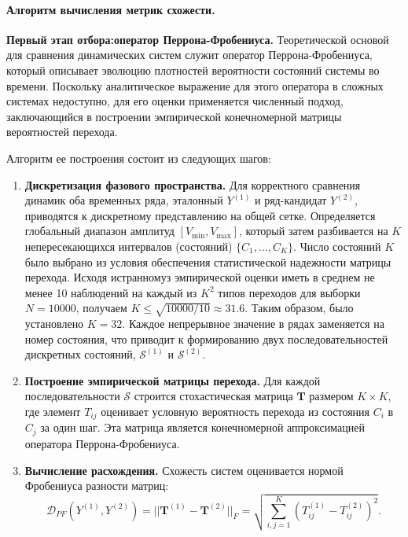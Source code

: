 \paragraph{Алгоритм вычисления метрик схожести.}

\textbf{Первый этап отбора:оператор Перрона-Фробениуса.}
Теоретической основой для сравнения динамических систем служит оператор Перрона-Фробениуса,
 который описывает эволюцию плотностей вероятности состояний системы во времени. 
 Поскольку аналитическое выражение для этого оператора в сложных системах недоступно, 
 для его оценки применяется численный подход, заключающийся в построении эмпирической 
 конечномерной матрицы вероятностей перехода.

Алгоритм ее построения состоит из следующих шагов:

\begin{enumerate}
    \item \textbf{Дискретизация фазового пространства.} Для корректного сравнения 
    динамик оба временных ряда, эталонный $Y^{(1)}$ и ряд-кандидат $Y^{(2)}$, приводятся
     к дискретному представлению на общей сетке. Определяется глобальный диапазон амплитуд 
     $[V_{\min}, V_{\max}]$, который затем разбивается на $K$ непересекающихся интервалов 
     (состояний) $\{C_1, \dots, C_K\}$.
     Число состояний $K$ было выбрано из условия обеспечения статистической надежности
       матрицы перехода. Исходя истранномуз эмпирической оценки иметь в среднем не менее 10 наблюдений
        на каждый из $K^2$ типов переходов для выборки $N=10000$, получаем
         $K \le \sqrt{10000/10} \approx 31.6$. Таким образом, было установлено $K=32$.
 Каждое
      непрерывное значение в рядах заменяется на номер состояния, что приводит к 
      формированию двух последовательностей дискретных состояний, 
      $\mathcal{S}^{(1)}$ и $\mathcal{S}^{(2)}$.

    \item \textbf{Построение эмпирической матрицы перехода.} Для каждой 
    последовательности $\mathcal{S}$ строится стохастическая матрица $\mathbf{T}$ 
    размером $K \times K$, где элемент $T_{ij}$ оценивает условную вероятность перехода
    из состояния $C_i$ в $C_j$ за один шаг. Эта матрица является конечномерной аппроксимацией
     оператора Перрона-Фробениуса.

    \item \textbf{Вычисление расхождения.} Схожесть систем оценивается нормой Фробениуса разности матриц:
    \[
    \mathcal{D}_{PF}(Y^{(1)}, Y^{(2)}) = ||\mathbf{T}^{(1)} - \mathbf{T}^{(2)}||_F =
     \sqrt{\sum_{i,j=1}^{K} (T_{ij}^{(1)} - T_{ij}^{(2)})^2}.
    \]
\end{enumerate}
